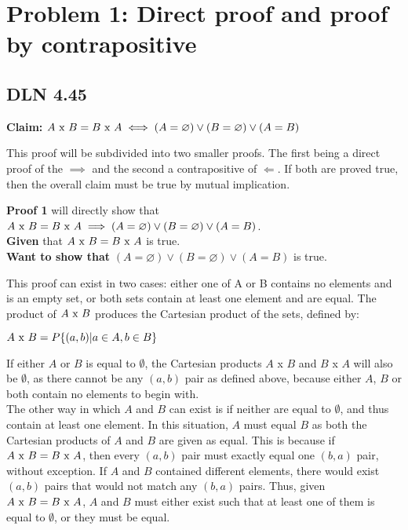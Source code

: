 \documentclass[titlepage]{article}
\begin{document}
 \maketitle

\section{Problem 1: Direct proof and proof by contrapositive}

\subsection{DLN 4.45}  %

\textbf{Claim:} \(A $ x $ B = B $ x $ A \iff (A= \varnothing) \lor (B= \varnothing) \lor (A=B)\)

This proof will be subdivided into two smaller proofs. The first being a direct proof of the $\implies$
and the second a contrapositive of $\Longleftarrow$. If both are proved true, then the overall claim must be true by mutual implication.

\textbf{Proof 1} will directly show that \(A $ x $ B = B $ x $ A \implies (A= \varnothing) \lor (B= \varnothing) \lor (A=B)\).\\
\textbf{Given} that \(A $ x $ B = B $ x $ A \) is true.\\
\textbf{Want to show that} \((A= \varnothing) \lor (B= \varnothing) \lor (A=B)\) is true.

This proof can exist in two cases: either one of A or B contains no elements and is an empty set, or both sets contain at least one element and are equal. The product of \(A $ x $ B\) produces the Cartesian product of the sets, defined by:
\begin{center}
\(A $ x $ B = P\{(a,b)|a \in A, b \in B\} \)
\end{center}
If either $A$ or $B$ is equal to $\emptyset$, the Cartesian products $A $ x $B$ and $B$ x $A$ will also be $\emptyset$, as there cannot be any $(a,b)$ pair as defined above, because either $A$, $B$ or both contain no elements to begin with.\\
The other way in which $A$ and $B$ can exist is if neither are equal to $\emptyset$, and thus contain at least one element. In this situation, $A$ must equal $B$ as both the Cartesian products of $A$ and $B$ are given as equal. This is because if \(A $ x $ B = B $ x $ A \), then every $(a,b)$ pair must exactly equal one $(b,a)$ pair, without exception. If $A$ and $B$ contained different elements, there would exist $(a,b)$ pairs that would not match any $(b,a)$ pairs. Thus, given \(A $ x $ B = B $ x $ A \), $A$ and $B$ must either exist such that at least one of them is equal to $\emptyset$, or they must be equal.
\end{document}

